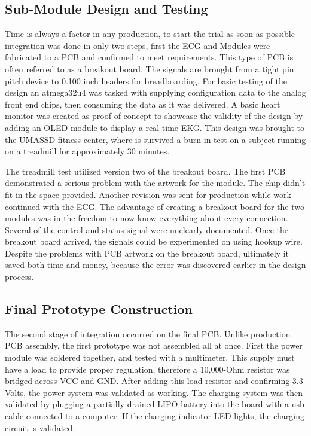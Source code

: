 \subsection {Sub-Module Design and Testing}
Time is always a factor in any production, to start the trial as soon as possible integration was done in only two steps, first the ECG and  Modules were fabricated to a PCB and confirmed to meet requirements. This type of PCB is often referred to as a breakout board. The signals are brought from a tight pin pitch device to 0.100 inch headers for breadboarding. For basic testing of the design an atmega32u4 was tasked with supplying configuration data to the analog front end chips, then consuming the data as it was delivered. A basic heart monitor was created as proof of concept to showcase the validity of the design by adding an OLED module to display a real-time EKG. This design was brought to the UMASSD fitness center, where is survived a burn in test on a subject running on a treadmill for approximately 30 minutes.

The treadmill test utilized version two of the breakout board. The first PCB demonstrated a serious problem with the artwork for the  module. The chip didn't fit in the space provided. Another revision was sent for production while work continued with the ECG. The advantage of creating a breakout board for the two modules was in the freedom to now know everything about every connection. Several of the control and status signal were unclearly documented. Once the breakout board arrived, the signals could be experimented on using hookup wire. Despite the problems with PCB artwork on the breakout board, ultimately it saved both time and money, because the error was discovered earlier in the design process.


\subsection {Final Prototype Construction}
The second stage of integration occurred on the final PCB. Unlike production PCB assembly, the first prototype was not assembled all at once. First the power module was soldered together, and tested with a multimeter. This supply must have a load to provide proper regulation, therefore a 10,000-Ohm resistor was bridged across VCC and GND. After adding this load resistor and confirming 3.3 Volts, the power system was validated as working. The charging system was then validated by plugging a partially drained LIPO battery into the board with a usb cable connected to a computer. If the charging indicator LED lights, the charging circuit is validated. 

